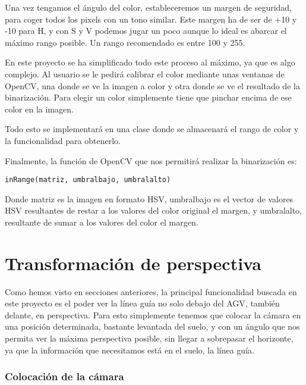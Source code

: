 Una vez tengamos el ángulo del color, estableceremos un margen de seguridad\cite{track_hsv}, para coger todos los pixels con un tono similar. Este margen ha de ser de +10 y -10 para H, y con S y V podemos jugar un poco aunque lo ideal es abarcar el máximo rango posible. Un rango recomendado es entre 100 y 255.


En este proyecto se ha simplificado todo este proceso al máximo, ya que es algo complejo. Al usuario se le pedirá calibrar el color mediante unas ventanas de OpenCV, una donde se ve la imagen a color y otra donde se ve el resultado de la binarización. Para elegir un color simplemente tiene que pinchar encima de ese color en la imagen.

Todo esto se implementará en una clase donde se almacenará el rango de color y la funcionalidad para obtenerlo.

Finalmente, la función de OpenCV que nos permitirá realizar la binarización es:
\begin{verbatim}
inRange(matriz, umbralbajo, umbralalto)
\end{verbatim}

Donde matriz es la imagen en formato HSV, umbralbajo es el vector de valores HSV resultantes de restar a los valores del color original el margen, y umbralalto, resultante de sumar a los valores del color el margen.


\section{Transformación de perspectiva}
Como hemos visto en secciones anteriores, la principal funcionalidad buscada en este proyecto es el poder ver la línea guía no solo debajo del AGV, también delante, en perspectiva. Para esto simplemente tenemos que colocar la cámara en una posición determinada, bastante levantada del suelo, y con un ángulo que nos permita ver la máxima perspectiva posible, sin llegar a sobrepasar el horizonte, ya que la información que necesitamos está en el suelo, la línea guía.

\subsubsection{Colocación de la cámara}


